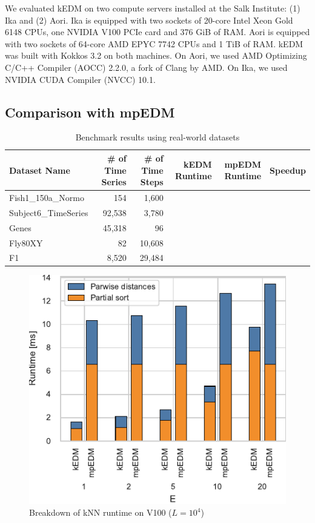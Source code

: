 \documentclass[conference]{IEEEtran}
\begin{document}

We evaluated kEDM on two compute servers installed at the Salk Institute: (1)
Ika and (2) Aori. Ika is equipped with two sockets of 20-core Intel Xeon Gold
6148 CPUs, one NVIDIA V100 PCIe card and 376 GiB of RAM\@. Aori is equipped with
two sockets of 64-core AMD EPYC 7742 CPUs and 1 TiB of RAM\@. kEDM was built
with Kokkos 3.2 on both machines. On Aori, we used AMD Optimizing C/C++ Compiler
(AOCC) 2.2.0, a fork of Clang by AMD. On Ika, we used NVIDIA CUDA Compiler (NVCC)
10.1.

\subsection{Comparison with mpEDM}

\begin{table}[]
\begin{tabular}{lrrrrr}
\toprule
Dataset Name         & \# of Time Series & \# of Time Steps & kEDM Runtime & mpEDM Runtime & Speedup \\
\midrule
Fish1\_150a\_Normo   & 154               & 1,600            &              &               &         \\
Subject6\_TimeSeries & 92,538            & 3,780            &              &               &         \\
Genes                & 45,318            & 96               &              &               &         \\
Fly80XY              & 82                & 10,608           &              &               &         \\
F1                   & 8,520             & 29,484           &              &               &         \\
\bottomrule
\end{tabular}
\caption{Benchmark results using real-world datasets}%
\label{tbl:realw-world}
\end{table}

\begin{figure}
    \centering
    \includegraphics{figs/breakdown_knn_v100}
    \caption{Breakdown of kNN runtime on V100 ($L=10^4$)}%
    \label{fig:breakdown-knn-v100}
\end{figure}
\end{document}
